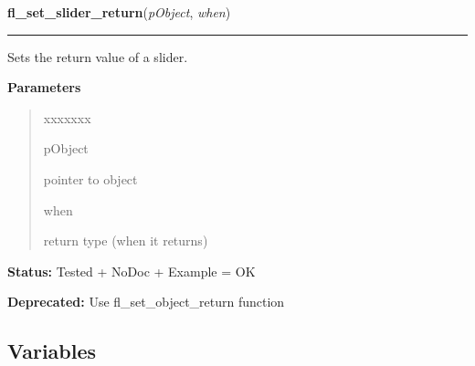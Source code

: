 \hspace{.8\funcindent}\begin{boxedminipage}{\funcwidth}

    \raggedright \textbf{fl\_set\_slider\_return}(\textit{pObject}, \textit{when})

    \vspace{-1.5ex}

    \rule{\textwidth}{0.5\fboxrule}
\setlength{\parskip}{2ex}
    Sets the return value of a slider.

\setlength{\parskip}{1ex}
      \textbf{Parameters}
      \vspace{-1ex}

      \begin{quote}
        \begin{Ventry}{xxxxxxx}

          \item[pObject]

          pointer to object

          \item[when]

          return type (when it returns)

        \end{Ventry}

      \end{quote}

\textbf{Status:} Tested + NoDoc + Example = OK



\textbf{Deprecated:} Use fl\_set\_object\_return function



    \end{boxedminipage}



  \subsection{Variables}

